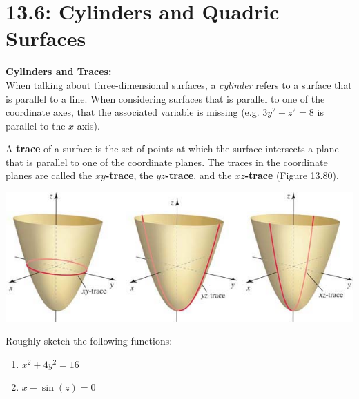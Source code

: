 \documentclass[mathNotesPreamble]{subfiles}
\begin{document}
\section{13.6: Cylinders and Quadric Surfaces}
  \textbf{Cylinders and Traces:}\\
    When talking about three-dimensional surfaces, a \textit{cylinder} refers to a surface that is parallel to a line. When considering surfaces that is parallel to one of the coordinate axes, that the associated variable is missing (e.g. $3y^2+z^2=8$ is parallel to the $x$-axis).
  
  \begin{defn*}[Trace]
    A \textbf{trace} of a surface is the set of points at which the surface intersects a plane that is parallel to one of the coordinate planes. The traces in the coordinate planes are called the \textbf{$xy$-trace}, the \textbf{$yz$-trace}, and the \textbf{$xz$-trace} (Figure 13.80).
  \end{defn*}
  \begin{center}
    \includegraphics[width=0.7\linewidth]{images/briggs_13_06/fig13_80}
  \end{center}

  \begin{ex*}
    Roughly sketch the following functions:
    \begin{enumerate}
      \item $x^2+4y^2=16$
      \item $x-\sin(z)=0$
    \end{enumerate}
  \end{ex*}
\end{document}
